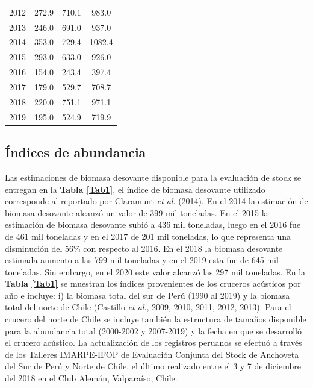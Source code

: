 \documentclass[letter,11pt]{article}
\begin{document}
\begin{table}[htb!]
\begin{tabular}{cccc}
 2012  &  272.9  &   710.1  &   983.0  \\
 2013  &  246.0  &   691.0  &   937.0  \\
 2014  &  353.0  &   729.4  &  1082.4  \\
 2015  &  293.0  &   633.0  &   926.0  \\
 2016  &  154.0  &   243.4  &   397.4  \\
 2017  &  179.0  &   529.7  &   708.7  \\
 2018  &  220.0  &   751.1  &   971.1  \\
 2019  &  195.0  &   524.9  &   719.9  \\
 \hline
 \end{tabular}
\end{table}
\vspace{0.5cm}

\newpage

\subsection{\'Indices de abundancia}


Las estimaciones de biomasa desovante disponible para la evaluaci\'on de stock
se entregan en la \textbf{Tabla \ref{Tab1}}, el \'indice de biomasa desovante utilizado
corresponde al reportado por Claramunt \textit{et al}. (2014). En el 2014 la estimaci\'on
de biomasa desovante alcanz\'o un valor de 399 mil toneladas. En el 2015 la
estimaci\'on de biomasa desovante subi\'o a 436 mil toneladas,
luego en el 2016 fue de 461 mil toneladas y en el 2017 de 201 mil
toneladas, lo que representa una disminuci\'on del 56\% con respecto al
2016. En el 2018 la biomasa desovante estimada aumento a las 799 mil
toneladas y en el 2019 esta fue de 645 mil toneladas. Sin embargo, en el
2020 este valor alcanz\'o las 297 mil toneladas. En la
\textbf{Tabla \ref{Tab1}} se muestran los \'indices provenientes de los
cruceros ac\'usticos por a\~{n}o e incluye: i) la biomasa total del sur de Per\'u
(1990 al 2019) y la biomasa total del norte de Chile (Castillo \textit{et al}., 2009,
2010, 2011, 2012, 2013). Para el crucero del norte de Chile se incluye tambi\'en la
estructura de tama\~{n}os disponible para la abundancia total (2000-2002 y 2007-2019)
y la fecha en que se desarroll\'o el crucero ac\'ustico. La actualizaci\'on de
los registros peruanos se efectu\'o a trav\'es de los Talleres IMARPE-IFOP
de Evaluaci\'on Conjunta del Stock de Anchoveta del Sur de Per\'u y Norte de
Chile, el \'ultimo realizado entre el 3 y 7 de diciembre del 2018 en el
Club Alem\'an, Valpara\'iso, Chile.\\
\end{document}
